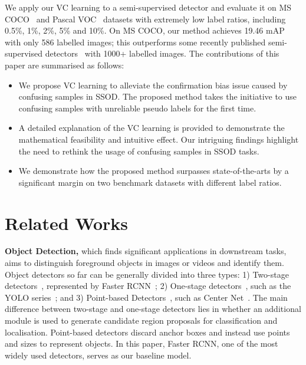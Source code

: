 \documentclass[runningheads]{llncs}
\begin{document}
We apply our VC learning to a semi-supervised detector and evaluate it on MS COCO~\cite{Tsung-Yi_2014_Mic} and Pascal VOC~\cite{Mark_2015_The} datasets with extremely low label ratios, including 0.5\%, 1\%, 2\%, 5\% and 10\%. On MS COCO, our method achieves 19.46 mAP with only 586 labelled images; this outperforms some recently published semi-supervised detectors~\cite{Kihyuk_2020_SATC,Qiang_2021_Ins} with 1000+ labelled images. The contributions of this paper are summarised as follows:

\begin{itemize}
\item We propose VC learning to alleviate the confirmation bias issue caused by confusing samples in SSOD. The proposed method takes the initiative to use confusing samples with unreliable pseudo labels for the first time. 
\item A detailed explanation of the VC learning is provided to demonstrate the mathematical feasibility and intuitive effect. Our intriguing  findings highlight the need to rethink the usage of confusing samples in SSOD tasks.
\item We demonstrate how the proposed method surpasses state-of-the-arts by a significant margin on two benchmark datasets with different label ratios.
\end{itemize}


\section{Related Works}

\textbf{Object Detection,} which finds significant applications in downstream tasks, aims to distinguish foreground objects in images or videos and identify them. Object detectors so far can be generally divided into three types: 1) Two-stage detectors~\cite{Shaoqing_2017_Fas,Zhaowei_2018_Cas},  represented by Faster RCNN~\cite{Shaoqing_2017_Fas}; 2) One-stage detectors~\cite{Joseph_2016_You,Alexey_2020_YOL,Tsung-Yi_2020_Foc,Nicolas_2020_End}, such as the YOLO series~\cite{Joseph_2016_You,Alexey_2020_YOL}; and 3) Point-based Detectors~\cite{Kaiwen_2019_Cen,Zhi_2019_FCO,law2018cornernet}, such as Center Net~\cite{Kaiwen_2019_Cen}. The main difference between two-stage and one-stage detectors lies in whether an additional module is used to generate candidate region proposals for classification and localisation. Point-based detectors discard anchor boxes and instead use points and sizes to represent objects. In this paper, Faster RCNN, one of the most widely used detectors, serves as our baseline model.
\end{document}
